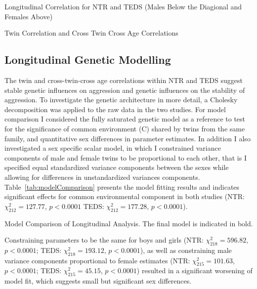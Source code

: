 \begin{table}
  \centering
  
  \caption[Longitudinal Correlation]{Longitudinal Correlation for NTR and TEDS (Males Below the Diagional and Females Above)}\label{tab:long_correlation}
\end{table}

\begin{landscape}
\begin{table}
  \centering
  \caption[Twin Correlation]{Twin Correlation and Cross Twin Cross Age Correlations}\label{tab:cross_corr}
\end{table}
\end{landscape}
\subsection{Longitudinal Genetic Modelling}
The twin and cross-twin-cross age correlations within NTR and TEDS suggest stable genetic influences on aggression and genetic influences on the stability of aggression.
To investigate the genetic architecture in more detail, a Cholesky decomposition was applied to the raw data in the two studies.
For model comparison I considered the fully saturated genetic model as a reference to test for the significance of common environment (C) shared by twins from the same family, and quantitative sex differences in parameter estimates.
In addition I also investigated a sex specific scalar model, in which I constrained variance components of male and female twins to be proportional to each other, that is I specified equal standardized variance components between the sexes while allowing for differences in unstandardized variances components.
Table~\ref{tab:modelComparison} presents the model fitting results and indicates significant effects for common environmental component in both studies (NTR: $\chi^2_{212}= 127.77$, $p<0.0001$ TEDS: $\chi^2_{212}= 177.28$, $p<0.0001$).
\begin{table}
  \centering
  \caption[Model Comparison of Longitudinal Analysis]{Model Comparison of Longitudinal Analysis.
  The final model is indicated in bold.}\label{tab:modelComparison}
\end{table}
Constraining parameters to be the same for boys and girls (NTR: $\chi^2_{218}= 596.82$, $p<0.0001$; TEDS: $\chi^2_{218}= 193.12$, $p<0.0001$), as well as constraining male variance components proportional to female estimates (NTR: $\chi^2_{215}= 101.63$, $p<0.0001$; TEDS: $\chi^2_{215}= 45.15$, $p<0.0001$) resulted in a significant worsening of model fit, which suggests small but significant sex differences.

